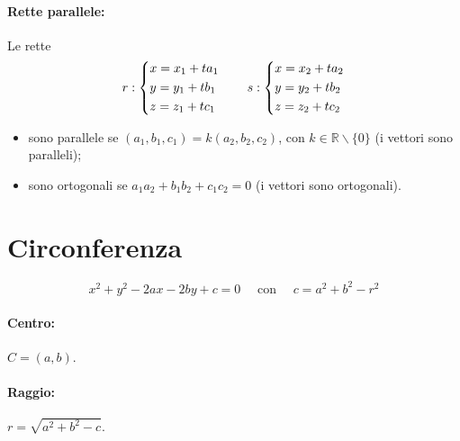 \documentclass[a4paper]{article}
\begin{document}
                \paragraph{Rette parallele:}
                        Le rette
                        \[
                                r: \begin{dcases}
                                        x = x_1 + t a_1 \\
                                        y = y_1 + t b_1 \\
                                        z = z_1 + t c_1
                                \end{dcases} \hspace{20pt}
                                s: \begin{dcases}
                                        x = x_2 + t a_2 \\
                                        y = y_2 + t b_2 \\
                                        z = z_2 + t c_2
                                \end{dcases}
                        \]
                        \begin{itemize}
                                \item sono parallele se $(a_1, b_1, c_1) = k (a_2, b_2, c_2)$, con $k \in \mathbb{R} \backslash \{0\}$ (i vettori sono paralleli);
                                \item sono ortogonali se $a_1 a_2 + b_1 b_2 + c_1 c_2 = 0$ (i vettori sono ortogonali).
                        \end{itemize}

        \section*{Circonferenza}
                \[
                        x^2 + y^2 - 2ax - 2by + c = 0 \quad\mbox{ con }\quad c = a^2 + b^2 - r^2
                \]

                \paragraph{Centro:}
                        $C = (a, b)$.

                \paragraph{Raggio:}
                        $r = \sqrt{a^2 + b^2 - c}$.
\end{document}
